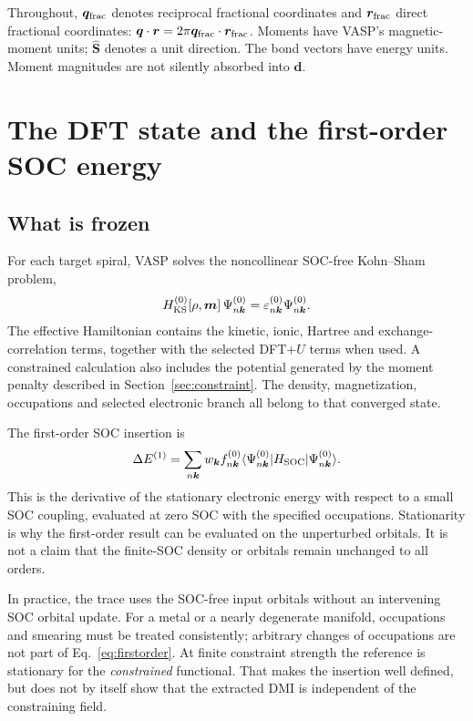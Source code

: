 \documentclass[11pt,a4paper]{article}
\numberwithin{equation}{section}
\newcommand{\vct}[1]{\bm{#1}}
\newcommand{\qh}{\vct q}
\newcommand{\kh}{\vct k}
\begin{document}
Throughout, $\qh_{\rm frac}$ denotes reciprocal fractional coordinates and
$\vct r_{\rm frac}$ direct fractional coordinates:
$\qh\cdot\vct r=2\pi\qh_{\rm frac}\cdot\vct r_{\rm frac}$.
Moments have VASP's magnetic-moment units; $\hat{\vct S}$ denotes a unit
direction. The bond vectors have energy units. Moment magnitudes are not
silently absorbed into $\vct d$.

\section{The DFT state and the first-order SOC energy}\label{sec:dft}

\subsection{What is frozen}

For each target spiral, VASP solves the noncollinear SOC-free
Kohn--Sham problem,
\begin{equation}\label{eq:ks}
 H^{(0)}_{\rm KS}[\rho,\vct m]\,\Psi^{(0)}_{n\kh}
 =\varepsilon^{(0)}_{n\kh}\Psi^{(0)}_{n\kh}.
\end{equation}
The effective Hamiltonian contains the kinetic, ionic, Hartree and
exchange-correlation terms, together with the selected DFT+$U$ terms when
used. A constrained calculation also includes the potential generated by
the moment penalty described in Section~\ref{sec:constraint}.
The density, magnetization, occupations and selected electronic branch all
belong to that converged state.

The first-order SOC insertion is
\begin{equation}\label{eq:firstorder}
 \Delta E^{(1)}=
 \sum_{n\kh}w_{\kh}f^{(0)}_{n\kh}
 \langle\Psi^{(0)}_{n\kh}|H_{\rm SOC}|\Psi^{(0)}_{n\kh}\rangle.
\end{equation}
This is the derivative of the stationary electronic energy with respect to
a small SOC coupling, evaluated at zero SOC with the specified occupations.
Stationarity is why the first-order result can be evaluated on the
unperturbed orbitals. It is not a claim that the finite-SOC density or
orbitals remain unchanged to all orders.

In practice, the trace uses the SOC-free input orbitals without an
intervening SOC orbital update. For a metal or a nearly degenerate manifold,
occupations and smearing must be treated consistently; arbitrary changes of
occupations are not part of Eq.~\eqref{eq:firstorder}. At finite constraint
strength the reference is stationary for the \emph{constrained} functional.
That makes the insertion well defined, but does not by itself show that the
extracted DMI is independent of the constraining field.
\end{document}
